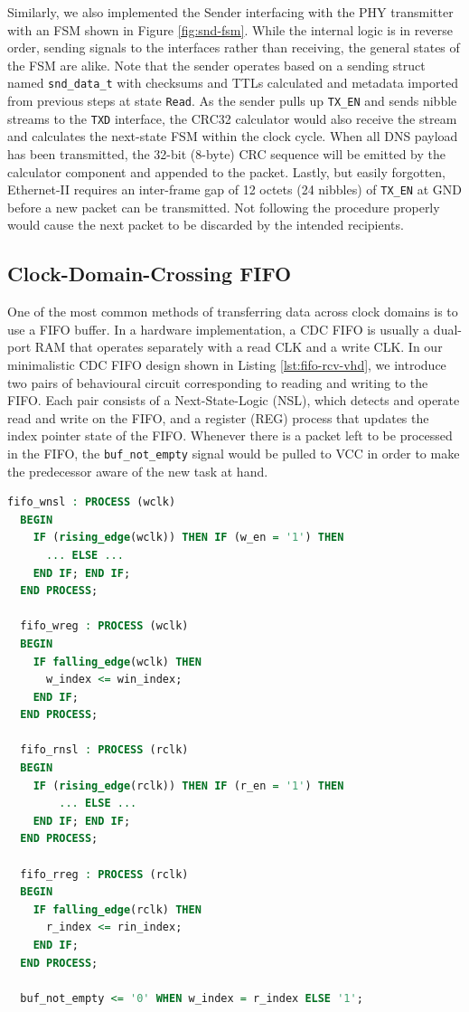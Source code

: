 \documentclass[a4paper]{report}
\newcommand{\code}{\texttt}
\begin{document}
Similarly, we also implemented the Sender interfacing with the PHY transmitter with an FSM shown in Figure \ref{fig:snd-fsm}. While the internal logic is in reverse order, sending signals to the interfaces rather than receiving, the general states of the FSM are alike. Note that the sender operates based on a sending struct named \code{snd\_data\_t} with checksums and TTLs calculated and metadata imported from previous steps at state \code{Read}. As the sender pulls up \code{TX\_EN} and sends nibble streams to the \code{TXD} interface, the CRC32 calculator would also receive the stream and calculates the next-state FSM within the clock cycle. When all DNS payload has been transmitted, the 32-bit (8-byte) CRC sequence will be emitted by the calculator component and appended to the packet. Lastly, but easily forgotten, Ethernet-II requires an inter-frame gap of 12 octets (24 nibbles) of \code{TX\_EN} at GND before a new packet can be transmitted. Not following the procedure properly would cause the next packet to be discarded by the intended recipients.

\subsection{Clock-Domain-Crossing FIFO}

One of the most common methods of transferring data across clock domains is to use a FIFO buffer. In a hardware implementation, a CDC FIFO is usually a dual-port RAM that operates separately with a read CLK and a write CLK. In our minimalistic CDC FIFO design shown in Listing \ref{lst:fifo-rcv-vhd}, we introduce two pairs of behavioural circuit corresponding to reading and writing to the FIFO. Each pair consists of a Next-State-Logic (NSL), which detects and operate read and write on the FIFO, and a register (REG) process that updates the index pointer state of the FIFO. Whenever there is a packet left to be processed in the FIFO, the \code{buf\_not\_empty} signal would be pulled to VCC in order to make the predecessor aware of the new task at hand.

\begin{lstlisting}[language=VHDL, caption=Snippet of FIFO \code{FIFO\_receive.vhd}, label={lst:fifo-rcv-vhd}]
  fifo_wnsl : PROCESS (wclk)
  BEGIN
    IF (rising_edge(wclk)) THEN IF (w_en = '1') THEN
      ... ELSE ...
    END IF; END IF;
  END PROCESS;

  fifo_wreg : PROCESS (wclk)
  BEGIN
    IF falling_edge(wclk) THEN
      w_index <= win_index;
    END IF;
  END PROCESS;

  fifo_rnsl : PROCESS (rclk)
  BEGIN
    IF (rising_edge(rclk)) THEN IF (r_en = '1') THEN
        ... ELSE ...
    END IF; END IF;
  END PROCESS;

  fifo_rreg : PROCESS (rclk)
  BEGIN
    IF falling_edge(rclk) THEN
      r_index <= rin_index;
    END IF;
  END PROCESS;

  buf_not_empty <= '0' WHEN w_index = r_index ELSE '1';
\end{lstlisting}
\end{document}
